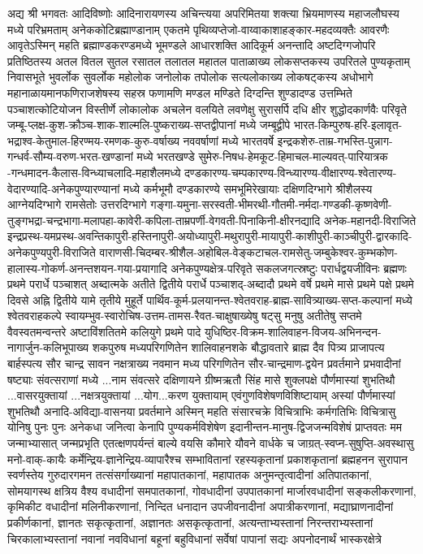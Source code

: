 अद्य श्री भगवतः आदिविष्णोः आदिनारायणस्य अचिन्त्यया अपरिमितया शक्त्या भ्रियमाणस्य महाजलौघस्य मध्ये परिभ्रमताम् अनेककोटिब्रह्माण्डानाम् एकतमे पृथिव्यप्तेजो-वाय्वाकाशाहङ्कार-महदव्यक्तैः आवरणैः आवृतेऽस्मिन् महति ब्रह्माण्डकरण्डमध्ये भूमण्डले आधारशक्ति आदिकूर्म अनन्तादि अष्टदिग्गजोपरि प्रतिष्ठितस्य अतल वितल सुतल रसातल तलातल महातल पाताळाख्य लोकसप्तकस्य उपरितले पुण्यकृताम् निवासभूते भुवर्लोक सुवर्लोक महोलोक जनोलोक तपोलोक सत्यलोकाख्य लोकषट्कस्य अधोभागे महानाळायमानफणिराजशेषस्य सहस्र फणामणि मण्डल मण्डिते दिग्दन्ति शुण्डादण्ड उत्तम्भिते पञ्चाशत्कोटियोजन विस्तीर्णे लोकालोक अचलेन वलयिते लवणेक्षु सुरासर्पि दधि क्षीर शुद्धोदकार्णवैः परिवृते जम्बू-प्लक्ष-कुश-क्रौञ्च-शाक-शाल्मलि-पुष्कराख्य-सप्तद्वीपानां मध्ये जम्बूद्वीपे भारत-किम्पुरुष-हरि-इलावृत-भद्राश्व-केतुमाल-हिरण्मय-रमणक-कुरु-वर्षाख्य नववर्षाणां मध्ये भारतवर्षे इन्द्रकशेरु-ताम्र-गभस्ति-पुन्नाग-गन्धर्व-सौम्य-वरुण-भरत-खण्डानां मध्ये भरतखण्डे सुमेरु-निषध-हेमकूट-हिमाचल-माल्यवत्-पारियात्रक -गन्धमादन-कैलास-विन्ध्याचलादि-महाशैलमध्ये दण्डकारण्य-चम्पकारण्य-विन्ध्यारण्य-वीक्षारण्य-श्वेतारण्य-वेदारण्यादि-अनेकपुण्यारण्यानां मध्ये कर्मभूमौ दण्डकारण्ये समभूमिरेखायाः दक्षिणदिग्भागे श्रीशैलस्य आग्नेयदिग्भागे रामसेतोः उत्तरदिग्भागे गङ्गा-यमुना-सरस्वती-भीमरथी-गौतमी-नर्मदा-गण्डकी-कृष्णवेणी-तुङ्गभद्रा-चन्द्रभागा-मलापहा-कावेरी-कपिला-ताम्रपर्णी-वेगवती-पिनाकिनी-क्षीरनद्यादि अनेक-महानदी-विराजिते इन्द्रप्रस्थ-यमप्रस्थ-अवन्तिकापुरी-हस्तिनापुरी-अयोध्यापुरी-मथुरापुरी-मायापुरी-काशीपुरी-काञ्चीपुरी-द्वारकादि-अनेकपुण्यपुरी-विराजिते वाराणसी-चिदम्बर-श्रीशैल-अहोबिल-वेङ्कटाचल-रामसेतु-जम्बुकेश्वर-कुम्भकोण-हालास्य-गोकर्ण-अनन्तशयन-गया-प्रयागादि अनेकपुण्यक्षेत्र-परिवृते सकलजगत्स्रष्टुः परार्धद्वयजीविनः ब्रह्मणः प्रथमे परार्धे पञ्चाशत् अब्दात्मके अतीते द्वितीये परार्धे पञ्चाशद्-अब्दादौ प्रथमे वर्षे प्रथमे मासे प्रथमे पक्षे प्रथमे दिवसे अह्नि द्वितीये यामे तृतीये मुहूर्ते पार्थिव-कूर्म-प्रलयानन्त-श्वेतवराह-ब्राह्म-सावित्र्याख्य-सप्त-कल्पानां मध्ये श्वेतवराहकल्पे स्वायम्भुव-स्वारोचिष-उत्तम-तामस-रैवत-चाक्षुषाख्येषु षट्सु मनुषु अतीतेषु सप्तमे वैवस्वतमन्वन्तरे अष्टाविंशतितमे कलियुगे प्रथमे पादे युधिष्ठिर-विक्रम-शालिवाहन-विजय-अभिनन्दन-नागार्जुन-कलिभूपाख्य शकपुरुष मध्यपरिगणितेन शालिवाहनशके बौद्धावतारे ब्राह्म दैव पित्र्य प्राजापत्य बार्हस्पत्य सौर चान्द्र सावन नक्षत्राख्य नवमान मध्य परिगणितेन सौर-चान्द्रमाण-द्वयेन प्रवर्तमाने प्रभवादीनां षष्ट्याः संवत्सराणां मध्ये ...नाम संवत्सरे दक्षिणायने ग्रीष्मऋतौ सिंह मासे शुक्लपक्षे पौर्णमास्यां शुभतिथौ ...वासरयुक्तायां ...नक्षत्रयुक्तायां ...योग...करण युक्तायाम् एवंगुणविशेषणविशिष्टायाम् अस्यां पौर्णमास्यां शुभतिथौ 
    अनादि-अविद्या-वासनया प्रवर्तमाने अस्मिन् महति संसारचक्रे विचित्राभिः कर्मगतिभिः विचित्रासु योनिषु पुनः पुनः अनेकधा जनित्वा केनापि पुण्यकर्मविशेषेण इदानीन्तन-मानुष-द्विजजन्मविशेषं प्राप्तवतः मम जन्माभ्यासात् जन्मप्रभृति एतत्क्षणपर्यन्तं बाल्ये वयसि कौमारे यौवने वार्धके च जाग्रत्-स्वप्न-सुषुप्ति-अवस्थासु मनो-वाक्-कायैः कर्मेन्द्रिय-ज्ञानेन्द्रिय-व्यापारैश्च सम्भावितानां रहस्यकृतानां प्रकाशकृतानां ब्रह्महनन सुरापान स्वर्णस्तेय गुरुदारगमन तत्संसर्गाख्यानां महापातकानां, महापातक अनुमन्तृत्वादीनां अतिपातकानां, सोमयागस्थ क्षत्रिय वैश्य वधादीनां समपातकानां, गोवधादीनां उपपातकानां मार्जारवधादीनां सङ्कलीकरणानां, कृमिकीट वधादीनां मलिनीकरणानां, निन्दित धनादान उपजीवनादीनां अपात्रीकरणानां, मद्याघ्राणनादीनां प्रकीर्णकानां, ज्ञानतः सकृत्कृतानां, अज्ञानतः असकृत्कृतानां, अत्यन्ताभ्यस्तानां निरन्तराभ्यस्तानां चिरकालाभ्यस्तानां नवानां नवविधानां बहूनां बहुविधानां सर्वेषां पापानां सद्यः अपनोदनार्थं भास्करक्षेत्रे 
